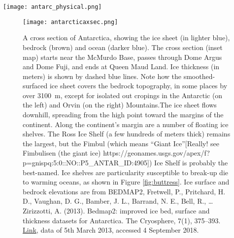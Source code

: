 \documentclass[amstex,12pt]{book}
\begin{document}
\begin{sidewaysfigure}[htp]
	\centering
  \texttt{[image: antarc\_physical.png]}%
	\caption{Antarctica and its perennial ice. Panel A (left) shows the physical features of the continent, with ice in white, exposed rock in brown, floating ice shelves in light blue, and principle bases marked by red squares. Note that the East and West Antarctic Ice Sheets are largely separated by the Transantarctic Mountains, while the ice sheet of the Antarctic Peninsula sticks off to the northeast. Figure is courtesy of Wikipedia, (https://en.wikipedia.org/wiki/Geography\_of\_Antarctica\#/media/File:Antarctica.svg) accessed 7 September 2018. Panel B shows the ice sheet's motion, with speeds indicated by the color scale in the upper left. Black lines indicate flow divides; places where ice flows in opposite directions. Note how the ice sheets drain through outlet glaciers (in reds and purples) to the peripheral floating ice shelves. The red (Panel A) and white (Panel B) show the cross section line in Figure \ref{fig:AISXC}. Panel B is courtesy of NASA's Goddard Space Flight Center Scientific Visualization Studio, https://svs.gsfc.nasa.gov/3849, accessed 7 September 2018. }  
	\label{fig:antarc_map}
\end{sidewaysfigure}


\begin{figure}[p]
	\centering
  \texttt{[image: antarcticaxsec.png]}%
	\caption{A cross section of Antarctica, showing the ice sheet (in lighter blue), bedrock (brown) and ocean (darker blue). The cross section (inset map) starts near the McMurdo Base, passes through Dome Argus and Dome Fuji, and ends at Queen Maud Land. Ice thickness (in meters) is shown by dashed blue lines. Note how the smoothed-surfaced ice sheet covers the bedrock topography, in some places by over \SI{3100}{\metre}, except for isolated out cropings in the Antarctic (on the left) and Orvin (on the right) Mountains.The ice sheet flows downhill, spreading from the high point toward the margins of the continent. Along the continent’s margin are a number of floating ice shelves. The Ross Ice Shelf (a few hundreds of meters thick) remains the largest, but the Fimbul (which means ``Giant Ice''[Really! see Fimbulisen (the giant ice) https://geonames.usgs.gov/apex/f?p=gnispq:5:0::NO::P5\_ANTAR\_ID:4905]) Ice Shelf is probably the best-named. Ice shelves are particularity susceptible to break-up die to warming oceans, as shown in Figure \ref{fig:buttress}. Ice surface and bedrock elevations are from BEDMAP2, Fretwell, P., Pritchard, H. D., Vaughan, D. G., Bamber, J. L., Barrand, N. E., Bell, R., … Zirizzotti, A. (2013). Bedmap2: improved ice bed, surface and thickness datasets for Antarctica. The Cryosphere, 7(1), 375–393. \href{https://doi.org/10.5194/tc-7-375-2013}{Link}, data of 5th March 2013, accessed 4 September 2018.}  
	\label{fig:AISXC}
\end{figure}
\end{document}

